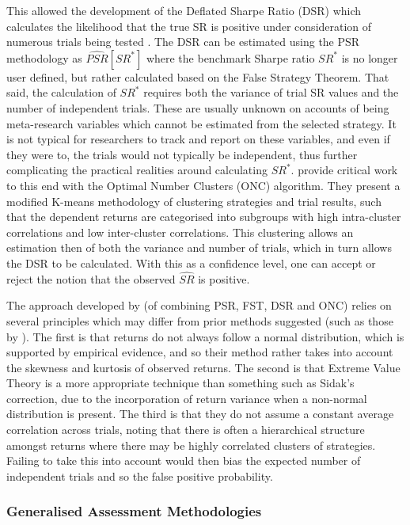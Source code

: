 \documentclass[a4paper,11pt,oneside]{article}
\theoremstyle{plain}
\theoremstyle{definition}
\begin{document}
	 This allowed the development of the Deflated Sharpe Ratio (DSR) which calculates the likelihood that the true SR is positive under consideration of numerous trials being tested \citep{BaileySharpe}. The DSR can be estimated using the PSR methodology as $\widehat{PSR}[SR^*]$ where the benchmark Sharpe ratio $SR^{*}$ is no longer user defined, but rather calculated based on the False Strategy Theorem. That said, the calculation of $SR^{*}$ requires both the variance of trial SR values and the number of independent trials. These are usually unknown on accounts of being meta-research variables which cannot be estimated from the selected strategy. It is not typical for researchers to track and report on these variables, and even if they were to, the trials would not typically be independent, thus further complicating the practical realities around calculating $SR^{*}$. \citet{PradoDSR} provide critical work to this end with the Optimal Number Clusters (ONC) algorithm. They present a modified K-means methodology of clustering strategies and trial results, such that the dependent returns are categorised into subgroups with high intra-cluster correlations and low inter-cluster correlations. This clustering allows an estimation then of both the variance and number of trials, which in turn allows the DSR to be calculated. With this as a confidence level, one can accept or reject the notion that the observed $\widehat{SR}$ is positive.
		\hfill \break 
		
	The approach developed by \citet{PradoDSR} (of combining PSR, FST, DSR and ONC) relies on several principles which may differ from prior methods suggested (such as those by \citet{Harvey}). The first is that returns do not always follow a normal distribution, which is supported by empirical evidence, and so their method rather takes into account the skewness and kurtosis of observed returns. The second is that Extreme Value Theory is a more appropriate technique than something such as Sidak's correction, due to the incorporation of return variance when a non-normal distribution is present. The third is that they do not assume a  constant average correlation across trials, noting that there is often a hierarchical structure amongst returns where there may be highly correlated clusters of strategies. Failing to take this into account would then bias the expected number of independent trials and so the false positive probability. 

	\subsubsection{Generalised Assessment Methodologies}\label{lr_backtest_cscv}
	
\end{document}
